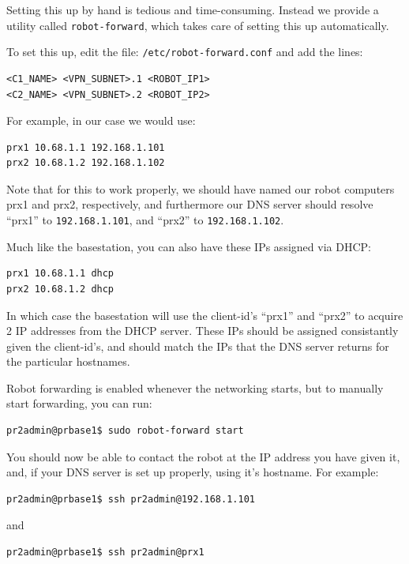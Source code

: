 Setting this up by hand is tedious and time-consuming.  Instead we
provide a utility called \texttt{robot-forward}, which takes care of
setting this up automatically.

To set this up, edit the file: \texttt{/etc/robot-forward.conf} and add the lines:

\begin{verbatim}
<C1_NAME> <VPN_SUBNET>.1 <ROBOT_IP1>
<C2_NAME> <VPN_SUBNET>.2 <ROBOT_IP2>
\end{verbatim}

For example, in our case we would use:

\begin{verbatim}
prx1 10.68.1.1 192.168.1.101
prx2 10.68.1.2 192.168.1.102
\end{verbatim}

Note that for this to work properly, we should have named our robot
computers prx1 and prx2, respectively, and furthermore our DNS server
should resolve ``prx1'' to \texttt{192.168.1.101}, and ``prx2'' to
\texttt{192.168.1.102}.

Much like the basestation, you can also have these IPs assigned via DHCP:

\begin{verbatim}
prx1 10.68.1.1 dhcp
prx2 10.68.1.2 dhcp
\end{verbatim}

In which case the basestation will use the client-id's ``prx1'' and
``prx2'' to acquire 2 IP addresses from the DHCP server.  These IPs
should be assigned consistantly given the client-id's, and should
match the IPs that the DNS server returns for the particular hostnames.  

Robot forwarding is enabled whenever the networking starts, but to
manually start forwarding, you can run:

\begin{verbatim}
pr2admin@prbase1$ sudo robot-forward start
\end{verbatim}

You should now be able to contact the robot at the IP address you have
given it, and, if your DNS server is set up properly, using it's
hostname.  For example:

\begin{verbatim}
pr2admin@prbase1$ ssh pr2admin@192.168.1.101
\end{verbatim}

and

\begin{verbatim}
pr2admin@prbase1$ ssh pr2admin@prx1
\end{verbatim}

